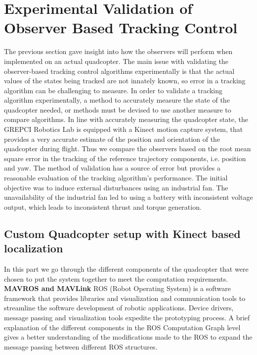 \documentclass[letterpaper%
, twoside%
, 12pt%
,memoire%
, english%
,creativecommons,hyperref%
]{thETS}
\begin{document}
\chapter{Experimental Validation of Observer Based Tracking Control} \label{Chap:ResultsPrac}
The previous section gave insight into how the observers will perform when implemented on an actual quadcopter. The main issue with validating the observer-based tracking control algorithms experimentally is that the actual values of the states being tracked are not innately known, so error in a tracking algorithm can be challenging to measure. In order to validate a tracking algorithm experimentally, a method to accurately measure the state of the quadcopter needed, or methods must be devised to use another measure to compare algorithms. In line with accurately measuring the quadcopter state, the GREPCI Robotics Lab is equipped with a Kinect motion capture system, that provides a very accurate estimate of the position and orientation of the quadcopter during flight. Thus we compare the observers based on the root mean square error in the tracking of the reference trajectory components, i.e. position and yaw. The method of validation has a source of error but provides a reasonable evaluation of the tracking algorithm's performance. The initial objective was to induce external disturbances using an industrial fan. The unavailability of the industrial fan led to using a battery with inconsistent voltage output, which leads to inconsistent thrust and torque generation.

\section{Custom Quadcopter setup with Kinect based localization}
In this part we go through the different components of the quadcopter that were chosen to put the system together to meet the computation requirements. \\
\textbf{MAVROS and MAVLink}
ROS (Robot Operating System) is a software framework that provides libraries and visualization and communication tools to streamline the software development of robotic applications. Device drivers, message passing and visualization tools expedite the prototyping process. 
A brief explanation of the different components in the ROS Computation Graph level gives a better understanding of the modifications made to the ROS to expand the message passing between different ROS structures. 
\end{document}
